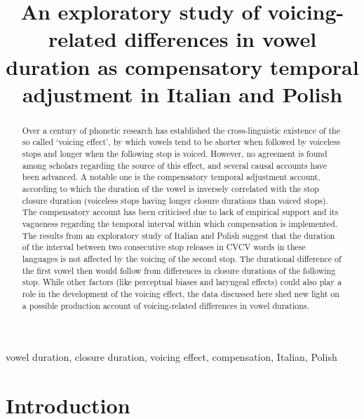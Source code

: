 \documentclass[charis]{glossa}
\title[An exploratory study of voicing-related differences in vowel duration]{An exploratory study of voicing-related differences in vowel duration as
compensatory temporal adjustment in Italian and Polish}
\author[]{
  }
\begin{document}
\sffamily
\maketitle


\begin{keywords}
  vowel duration, closure duration, voicing effect, compensation, Italian,
  Polish
\end{keywords}


\rmfamily

\begin{abstract}
  Over a century of phonetic research has established the cross-linguistic existence of the so called `voicing effect', by which vowels tend to be shorter when followed by voiceless stops and longer when the following stop is voiced.
  However, no agreement is found among scholars regarding the source of this effect, and several causal accounts have been advanced.
  A notable one is the compensatory temporal adjustment account, according to which the duration of the vowel is inversely correlated with the stop closure duration (voiceless stops having longer closure durations than voiced stops).
  The compensatory account has been criticised due to lack of empirical support and its vagueness regarding the temporal interval within which compensation is implemented.
  The results from an exploratory study of Italian and Polish suggest that the duration of the interval between two consecutive stop releases in CVCV words in these languages is not affected by the voicing of the second stop.
  The durational difference of the first vowel then would follow from differences in closure durations of the following stop.
  While other factors (like perceptual biases and laryngeal effects) could also play a role in the development of the voicing effect, the data discussed here shed new light on a possible production account of voicing-related differences in vowel durations.
\end{abstract}

\hypertarget{introduction}{%
\section{Introduction}\label{introduction}}

\label{s:intro}
\end{document}
